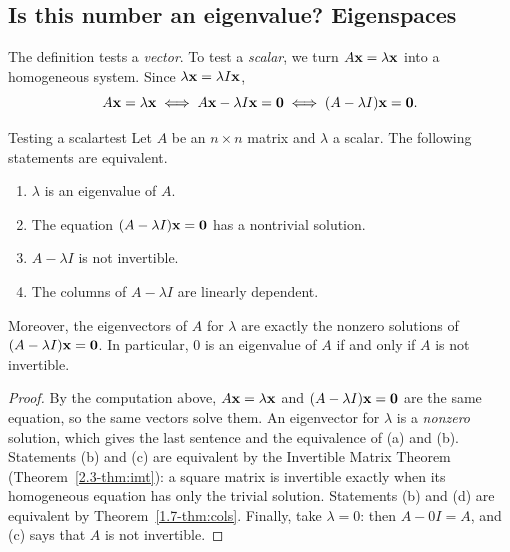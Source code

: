 \documentclass[11pt]{article}
\begin{document}
\subsection*{Is this number an eigenvalue? Eigenspaces}

The definition tests a \emph{vector}. To test a \emph{scalar}, we turn $A\mathbf{x}=\lambda\mathbf{x}$ into a homogeneous system. Since $\lambda\mathbf{x}=\lambda I\mathbf{x}$,
\[
A\mathbf{x}=\lambda\mathbf{x}\iff A\mathbf{x}-\lambda I\mathbf{x}=\mathbf{0}\iff (A-\lambda I)\mathbf{x}=\mathbf{0}.
\]

\begin{thm}{Testing a scalar}{test}
Let $A$ be an $n\times n$ matrix and $\lambda$ a scalar. The following statements are equivalent.
\begin{enumerate}[label=(\alph*),itemsep=1pt]
  \item $\lambda$ is an eigenvalue of $A$.
  \item The equation $(A-\lambda I)\mathbf{x}=\mathbf{0}$ has a nontrivial solution.
  \item $A-\lambda I$ is not invertible.
  \item The columns of $A-\lambda I$ are linearly dependent.
\end{enumerate}
Moreover, the eigenvectors of $A$ for $\lambda$ are exactly the nonzero solutions of $(A-\lambda I)\mathbf{x}=\mathbf{0}$. In particular, $0$ is an eigenvalue of $A$ if and only if $A$ is not invertible.
\end{thm}

\begin{proof}
By the computation above, $A\mathbf{x}=\lambda\mathbf{x}$ and $(A-\lambda I)\mathbf{x}=\mathbf{0}$ are the same equation, so the same vectors solve them. An eigenvector for $\lambda$ is a \emph{nonzero} solution, which gives the last sentence and the equivalence of (a) and (b). Statements (b) and (c) are equivalent by the Invertible Matrix Theorem (Theorem~\ref{2.3-thm:imt}): a square matrix is invertible exactly when its homogeneous equation has only the trivial solution. Statements (b) and (d) are equivalent by Theorem~\ref{1.7-thm:cols}. Finally, take $\lambda=0$: then $A-0I=A$, and (c) says that $A$ is not invertible.
\end{proof}
\end{document}
